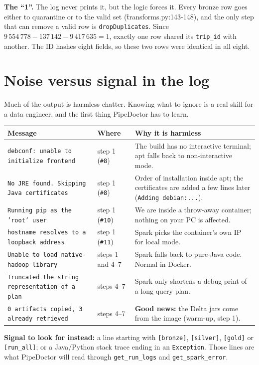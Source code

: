 \documentclass[11pt,a4paper]{article}
\let\oldsection\section
\renewcommand{\section}{\Needspace*{9\baselineskip}\oldsection}
\begin{document}
\medskip
\textbf{The ``1''.} The log never prints it, but the logic forces it. Every bronze row goes either to quarantine or to the valid set (\f{transforms.py:143-148}), and the only step that can remove a valid row is \texttt{dropDuplicates}. Since $9\,554\,778 - 137\,142 - 9\,417\,635 = 1$, exactly one row shared its \texttt{trip\_id} with another. The ID hashes eight fields, so these two rows were identical in all eight.

\section{Noise versus signal in the log}
Much of the output is harmless chatter. Knowing what to ignore is a real skill for a data engineer, and the first thing PipeDoctor has to learn.

\begin{longtable}{@{}p{5.2cm}p{2.4cm}p{8.4cm}@{}}
\toprule
Message & Where & Why it is harmless \\
\midrule
\endhead
\texttt{debconf: unable to initialize frontend} & step 1 (\texttt{\#8}) & The build has no interactive terminal; apt falls back to non-interactive mode. \\
\texttt{No JRE found. Skipping Java certificates} & step 1 (\texttt{\#8}) & Order of installation inside apt; the certificates are added a few lines later (\texttt{Adding debian:...}). \\
\texttt{Running pip as the 'root' user} & step 1 (\texttt{\#10}) & We are inside a throw-away container; nothing on your PC is affected. \\
\texttt{hostname resolves to a loopback address} & step 1 (\texttt{\#11}) & Spark picks the container's own IP for local mode. \\
\texttt{Unable to load native-hadoop library} & steps 1 and 4--7 & Spark falls back to pure-Java code. Normal in Docker. \\
\texttt{Truncated the string representation of a plan} & steps 4--7 & Spark only shortens a debug print of a long query plan. \\
\texttt{0 artifacts copied, 3 already retrieved} & steps 4--7 & \textbf{Good news:} the Delta jars come from the image (warm-up, step 1). \\
\bottomrule
\end{longtable}

\begin{watch}\textbf{Signal to look for instead:} a line starting with \texttt{[bronze]}, \texttt{[silver]}, \texttt{[gold]} or \texttt{[run\_all]}; or a Java/Python stack trace ending in an \texttt{Exception}. Those lines are what PipeDoctor will read through \texttt{get\_run\_logs} and \texttt{get\_spark\_error}.\end{watch}
\end{document}
